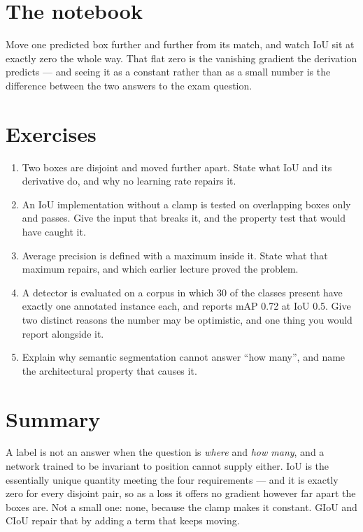 \documentclass[11pt,a4paper]{article}
\begin{document}
\section{The notebook}

\begin{trybox}[title={What to change}]
Move one predicted box further and further from its match, and watch IoU sit at
exactly zero the whole way. That flat zero is the vanishing gradient the
derivation predicts --- and seeing it as a constant rather than as a small
number is the difference between the two answers to the exam question.
\end{trybox}

\section{Exercises}

\begin{enumerate}[leftmargin=1.6em,itemsep=4pt]
  \item Two boxes are disjoint and moved further apart. State what IoU and its
        derivative do, and why no learning rate repairs it. \hfill \scope{[5]}
  \item An IoU implementation without a clamp is tested on overlapping boxes
        only and passes. Give the input that breaks it, and the property test
        that would have caught it. \hfill \scope{[5]}
  \item Average precision is defined with a maximum inside it. State what that
        maximum repairs, and which earlier lecture proved the problem.
        \hfill \scope{[4]}
  \item A detector is evaluated on a corpus in which 30 of the classes present
        have exactly one annotated instance each, and reports mAP 0.72 at IoU
        0.5. Give two distinct reasons the number may be optimistic, and one
        thing you would report alongside it. \hfill \scope{[3]}
  \item Explain why semantic segmentation cannot answer ``how many'', and name
        the architectural property that causes it. \hfill \scope{[4]}
\end{enumerate}

\section*{Summary}

A label is not an answer when the question is \emph{where} and \emph{how many},
and a network trained to be invariant to position cannot supply either. IoU is
the essentially unique quantity meeting the four requirements --- and it is
exactly zero for every disjoint pair, so as a loss it offers no gradient
however far apart the boxes are. Not a small one: none, because the clamp makes
it constant. GIoU and CIoU repair that by adding a term that keeps moving.
\end{document}
